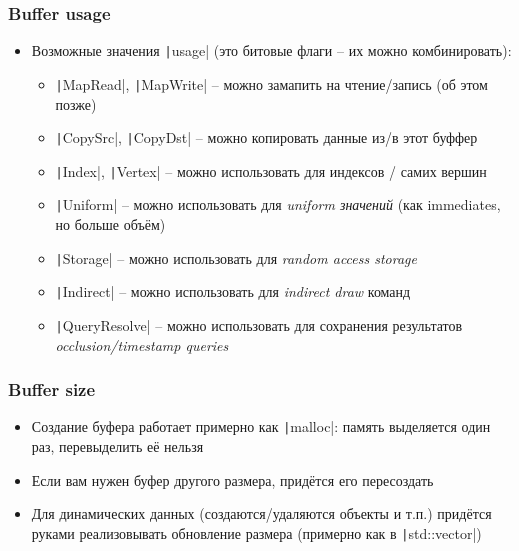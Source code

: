 \documentclass[10pt]{beamer}
\begin{document}
\begin{frame}[fragile]
\frametitle{Buffer usage}
\begin{itemize}
\item Возможные значения \texttt|usage| (это битовые флаги -- их можно комбинировать):
\pause
\begin{itemize}
\item \texttt|MapRead|, \texttt|MapWrite| -- можно замапить на чтение/запись (об этом позже)
\pause
\item \texttt|CopySrc|, \texttt|CopyDst| -- можно копировать данные из/в этот буффер
\pause
\item \texttt|Index|, \texttt|Vertex| -- можно использовать для индексов / самих вершин
\pause
\item \texttt|Uniform| -- можно использовать для \textit{uniform значений} (как immediates, но больше объём)
\pause
\item \texttt|Storage| -- можно использовать для \textit{random access storage}
\pause
\item \texttt|Indirect| -- можно использовать для \textit{indirect draw} команд
\pause
\item \texttt|QueryResolve| -- можно использовать для сохранения результатов \textit{occlusion/timestamp queries}
\end{itemize}
\end{itemize}
\end{frame}

\begin{frame}[fragile]
\frametitle{Buffer size}
\begin{itemize}
\item Создание буфера работает примерно как \texttt|malloc|: память выделяется один раз, перевыделить её нельзя
\pause
\item Если вам нужен буфер другого размера, придётся его пересоздать
\pause
\item Для динамических данных (создаются/удаляются объекты и т.п.) придётся руками реализовывать обновление размера (примерно как в \texttt|std::vector|)
\end{itemize}
\end{frame}
\end{document}
